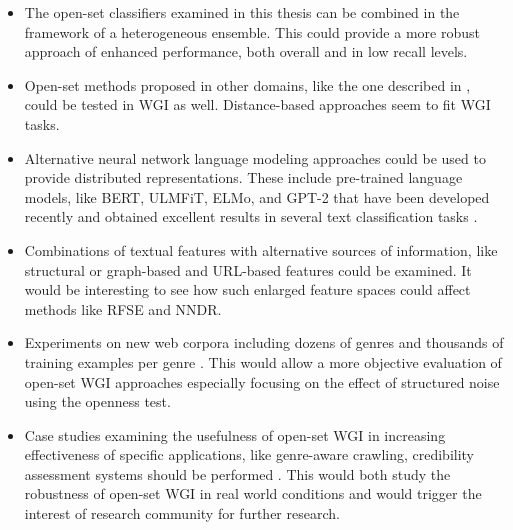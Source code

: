 \begin{itemize}
    \item The open-set classifiers examined in this thesis can be combined in the framework of a heterogeneous ensemble. This could provide a more robust approach of enhanced performance, both overall and in low recall levels.
    \item Open-set methods proposed in other domains, like the one described in , could be tested in WGI as well. Distance-based approaches seem to fit WGI tasks. 
    \item Alternative neural network language modeling approaches could be used to provide distributed representations. These include pre-trained language models, like BERT, ULMFiT, ELMo, and GPT-2 that have been developed recently and obtained excellent results in several text classification tasks .
    \item Combinations of textual features with alternative sources of information, like structural or graph-based and URL-based features could be examined. It would be interesting to see how such enlarged feature spaces could affect methods like RFSE and NNDR.
    \item Experiments on new web corpora including dozens of genres and thousands of training examples per genre . This would allow a more objective evaluation of open-set WGI approaches especially focusing on the effect of structured noise using the openness test.
    \item Case studies examining the usefulness of open-set WGI in increasing effectiveness of specific applications, like genre-aware crawling, credibility assessment systems should be performed . This would both study the robustness of open-set WGI in real world conditions and would trigger the interest of research community for further research.
    
\end{itemize}
